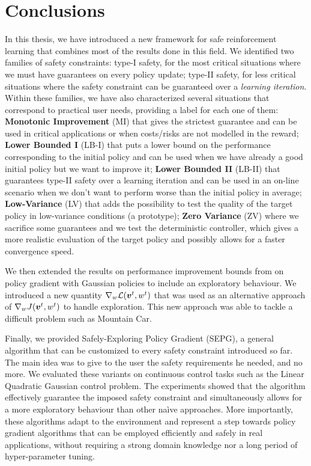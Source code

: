 \chapter{Conclusions}
\label{ch:conclusion}

In this thesis, we have introduced a new framework for safe reinforcement learning that combines most of the results done in this field. We identified two families of safety constraints: type-I safety, for the most critical situations where we must have guarantees on every policy update; type-II safety, for less critical situations where the safety constraint can be guaranteed over a \textit{learning iteration}. Within these families, we have also characterized several situations that correspond to practical user needs, providing a label for each one of them:
\textbf{Monotonic Improvement} (MI) that gives the strictest guarantee and can be used in critical applications or when costs/risks are not modelled in the reward; \textbf{Lower Bounded I} (LB-I) that puts a lower bound on the performance corresponding to the initial policy and can be used when we have already a good initial policy but we want to improve it; \textbf{Lower Bounded II} (LB-II) that guarantees type-II safety over a learning iteration and can be used in an on-line scenario when we don't want to perform worse than the initial policy in average; \textbf{Low-Variance} (LV) that adds the possibility to test the quality of the target policy in low-variance conditions (\eg a prototype); \textbf{Zero Variance} (ZV) where we sacrifice some guarantees and we test the deterministic controller, which gives a more realistic evaluation of the target policy and possibly allows for a faster convergence speed.



We then extended the results on performance improvement bounds from \cite{adaptive_batch,adaptive_step} on policy gradient with Gaussian policies to include an exploratory behaviour. We introduced a new quantity $\nabla_{w}\mathcal{L}(\boldsymbol{v}^t, w^t)$ that was used as an alternative approach of $\nabla_w J(\boldsymbol{v}^t, w^t)$ to handle exploration. This new approach was able to tackle a difficult problem such as Mountain Car.

Finally, we provided Safely-Exploring Policy Gradient (SEPG), a general algorithm that can be customized to every safety constraint introduced so far. The main idea was to give to the user the safety requirements he needed, and no more. We evaluated these variants on continuous control tasks such as the Linear Quadratic Gaussian control problem. The experiments showed that the algorithm effectively guarantee the imposed safety constraint and simultaneously allows for a more exploratory behaviour than other na\`ive approaches. More importantly, these algorithms adapt to the environment and represent a step towards policy gradient algorithms that can be employed efficiently and safely in real applications, without requiring a strong domain knowledge nor a long period of hyper-parameter tuning. 

